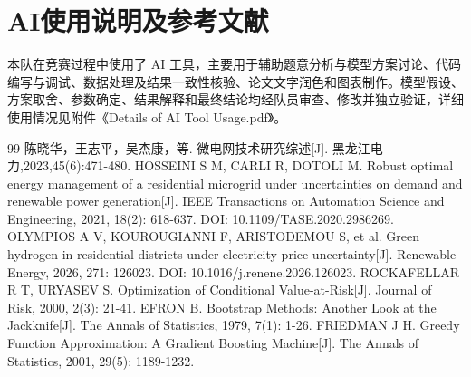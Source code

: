 \section{AI使用说明及参考文献}
本队在竞赛过程中使用了 AI 工具，主要用于辅助题意分析与模型方案讨论、代码编写与调试、数据处理及结果一致性核验、论文文字润色和图表制作。模型假设、方案取舍、参数确定、结果解释和最终结论均经队员审查、修改并独立验证，详细使用情况见附件《Details of AI Tool Usage.pdf》。

\begin{thebibliography}{99}
   陈晓华，王志平，吴杰康，等. 微电网技术研究综述[J]. 黑龙江电力,2023,45(6):471-480.
   HOSSEINI S M, CARLI R, DOTOLI M. Robust optimal energy management of a residential microgrid under uncertainties on demand and renewable power generation[J]. IEEE Transactions on Automation Science and Engineering, 2021, 18(2): 618-637. DOI: 10.1109/TASE.2020.2986269.
   OLYMPIOS A V, KOUROUGIANNI F, ARISTODEMOU S, et al. Green hydrogen in residential districts under electricity price uncertainty[J]. Renewable Energy, 2026, 271: 126023. DOI: 10.1016/j.renene.2026.126023.
   ROCKAFELLAR R T, URYASEV S. Optimization of Conditional Value-at-Risk[J]. Journal of Risk, 2000, 2(3): 21-41.
   EFRON B. Bootstrap Methods: Another Look at the Jackknife[J]. The Annals of Statistics, 1979, 7(1): 1-26.
   FRIEDMAN J H. Greedy Function Approximation: A Gradient Boosting Machine[J]. The Annals of Statistics, 2001, 29(5): 1189-1232.
\end{thebibliography}
